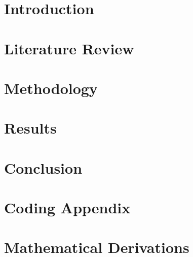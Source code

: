 \documentclass[11pt, a4paper]{article}
\begin{document}

    \hypersetup{linkcolor= black}
    \tableofcontents
    \newpage

    \onehalfspacing

    \section{Introduction}
    

    \newpage

    \section{Literature Review}
    

    \section{Methodology}
    

    \newpage
    
    \section{Results}
    
    
    \section{Conclusion}
    

    \appendix
    \section{Coding Appendix}
    
    
    \section{Mathematical Derivations}
    
    
\end{document}
